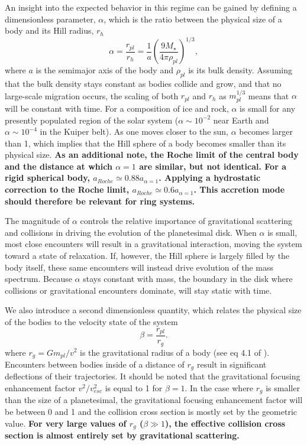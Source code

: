 \documentclass[twocolumn,linenumbers]{aastex63}
\begin{document}
An insight into the expected behavior in this regime can be gained by
defining a dimensionless parameter, $\alpha$, which is the ratio
between the physical size of a body and its Hill radius, $r_{h}$
\begin{equation}\label{eq:alpha}
	\alpha = \frac{r_{pl}}{r_{h}} = \frac{1}{a} \left( \frac{9 M_{\star}}{4 \pi \rho_{pl}} \right)^{1/3},
\end{equation}
where $a$ is the semimajor axis of the body and $\rho_{pl}$ is its
bulk density. Assuming that the bulk density stays constant as bodies collide and
grow, and that no large-scale migration occurs, the scaling of both
$r_{pl}$ and $r_{h}$ as $m_{pl}^{1/3}$ means that $\alpha$ will be
constant with time. For a composition of ice and rock, $\alpha$ is
small for any presently populated region of the solar system ($\alpha \sim
10^{-2}$ near Earth and $\alpha \sim 10^{-4}$ in the Kuiper belt). As
one moves closer to the sun, $\alpha$ becomes larger than 1, which
implies that the Hill sphere of a body becomes smaller than its physical size.
\textbf{As an additional note, the Roche limit of the central body and the distance at which $\alpha = 1$ are
similar, but not identical. For a rigid spherical body, $a_{Roche} \simeq 0.88 a_{\alpha = 1}$. Applying a hydrostatic correction to the Roche limit, $a_{Roche} \simeq 0.6 a_{\alpha = 1}$. This accretion mode should
therefore be relevant for ring systems.}

The magnitude of $\alpha$ controls the relative importance of gravitational scattering and collisions in driving the evolution of the planetesimal disk. When $\alpha$ is small, most close encounters will result in a gravitational interaction, moving the system toward a state of relaxation. If, however, the Hill sphere is largely filled by the body itself, these same encounters will instead drive evolution of the mass spectrum. Because $\alpha$ stays constant with mass, the boundary in the disk where collisions or gravitational encounters dominate, will stay static with time.

We also introduce a second dimensionless quantity, which relates the physical size of the bodies to the velocity state of the system
\begin{equation}\label{eq:beta}
	\beta = \frac{r_{pl}}{r_{g}}.
\end{equation}
where $r_{g} = G m_{pl} / v^{2}$ is the gravitational radius of a body (see eq 4.1 of \citet{ida90}). Encounters between bodies inside of a distance of $r_{g}$ result in significant deflections of their trajectories. It should be noted that the gravitational focusing enhancement factor $v^{2}/v_{esc}^{2}$ is equal to 1 for $\beta = 1$. In the case where $r_{g}$ is smaller than the size of a planetesimal, the gravitational focusing enhancement factor will be between 0 and 1 and the collision cross section is mostly set by the geometric value. \textbf{For very large values of $r_{g}$ ($\beta \gg 1$), the effective collision cross section is almost entirely set by gravitational scattering.}
\end{document}
